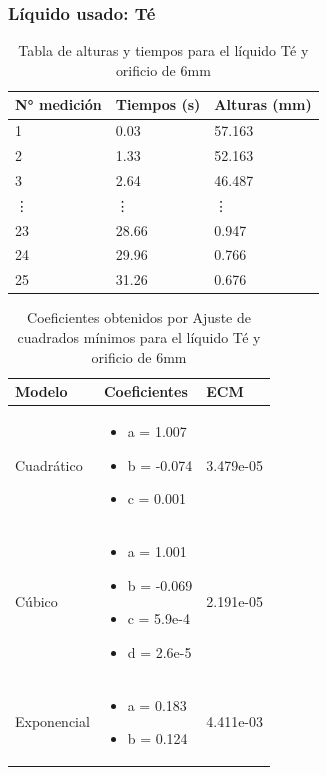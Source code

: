 \documentclass{article}
\begin{document}
\subsubsection{Líquido usado: Té}
\begin{table}[h]
    \begin{center}
        \begin{tabular}{ | m{2cm} | m{2cm} | m{2cm} | }
            \hline N° medición & Tiempos (s) & Alturas (mm) \\ 
            \hline 1 & 0.03 & 57.163 \\
            \hline 2 & 1.33 & 52.163 \\
            \hline 3 & 2.64 & 46.487 \\
            \hline \vdots & \vdots & \vdots \\            
            \hline 23 & 28.66 & 0.947 \\
            \hline 24 & 29.96 & 0.766 \\
            \hline 25 & 31.26 & 0.676 \\
            \hline
        \end{tabular}
    \end{center}
    \caption{Tabla de alturas y tiempos para el líquido Té y orificio de 6mm}
\end{table}

\begin{table}[h]
    \begin{center}
        \begin{tabular}{ | m{2cm} | m{5cm} | m{2cm} | }
            \hline Modelo & Coeficientes & ECM \\ 
            \hline Cuadrático & \begin{itemize}
                \item a = 1.007
                \item b = -0.074
                \item c = 0.001
            \end{itemize} & 3.479e-05\\
            \hline Cúbico & \begin{itemize}
                \item a = 1.001
                \item b = -0.069
                \item c = 5.9e-4
                \item d = 2.6e-5
            \end{itemize} & 2.191e-05 \\
            \hline Exponencial & \begin{itemize}
                \item a = 0.183
                \item b = 0.124
            \end{itemize} & 4.411e-03 \\
            \hline
        \end{tabular}
    \end{center}
    \caption{Coeficientes obtenidos por Ajuste de cuadrados mínimos para el líquido Té y orificio de 6mm}
\end{table}
\end{document}
